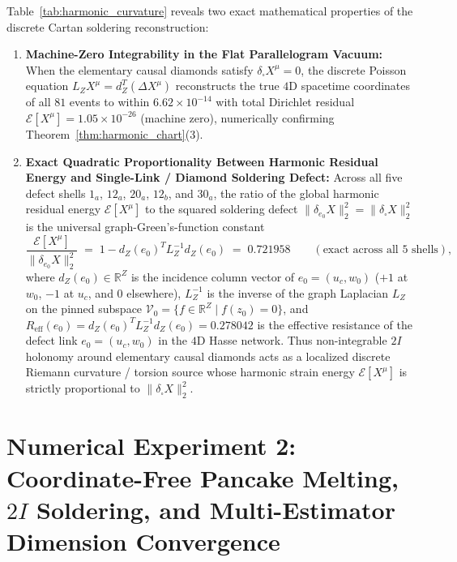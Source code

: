 \documentclass[11pt,a4paper]{article}
\theoremstyle{definition}
\theoremstyle{remark}
\newcommand{\R}{\mathbb{R}}
\begin{document}
Table~\ref{tab:harmonic_curvature} reveals two exact mathematical properties of the discrete Cartan soldering reconstruction:
\begin{enumerate}
    \item \textbf{Machine-Zero Integrability in the Flat Parallelogram Vacuum:} When the elementary causal diamonds satisfy $\delta_\square X^\mu = 0$, the discrete Poisson equation $L_Z X^\mu = d_Z^T(\Delta X^\mu)$ reconstructs the true $4\text{D}$ spacetime coordinates of all $81$ events to within $6.62 \times 10^{-14}$ with total Dirichlet residual $\mathcal{E}[X^\mu] = 1.05 \times 10^{-26}$ (machine zero), numerically confirming Theorem~\ref{thm:harmonic_chart}(3).
    \item \textbf{Exact Quadratic Proportionality Between Harmonic Residual Energy and Single-Link / Diamond Soldering Defect:} Across all five defect shells $1_a$, $12_a$, $20_a$, $12_b$, and $30_a$, the ratio of the global harmonic residual energy $\mathcal{E}[X^\mu]$ to the squared soldering defect $\|\delta_{e_0} X\|_2^2 = \|\delta_\square X\|_2^2$ is the universal graph-Green's-function constant
    \begin{equation}
    \label{eq:greens_ratio}
    \frac{\mathcal{E}[X^\mu]}{\|\delta_{e_0} X\|_2^2} \;=\; 1 - d_Z(e_0)^T L_Z^{-1} d_Z(e_0) \;=\; 0.721958 \qquad (\text{exact across all } 5 \text{ shells}),
    \end{equation}
    where $d_Z(e_0) \in \R^Z$ is the incidence column vector of $e_0 = (u_c, w_0)$ ($+1$ at $w_0$, $-1$ at $u_c$, and $0$ elsewhere), $L_Z^{-1}$ is the inverse of the graph Laplacian $L_Z$ on the pinned subspace $\mathcal{V}_0 = \{f \in \R^Z \mid f(z_0) = 0\}$, and $R_{\mathrm{eff}}(e_0) = d_Z(e_0)^T L_Z^{-1} d_Z(e_0) = 0.278042$ is the effective resistance of the defect link $e_0 = (u_c, w_0)$ in the $4\text{D}$ Hasse network. Thus non-integrable $2I$ holonomy around elementary causal diamonds acts as a localized discrete Riemann curvature / torsion source whose harmonic strain energy $\mathcal{E}[X^\mu]$ is strictly proportional to $\|\delta_\square X\|_2^2$.
\end{enumerate}

\section{Numerical Experiment 2: Coordinate-Free Pancake Melting, \texorpdfstring{$2I$}{2I} Soldering, and Multi-Estimator Dimension Convergence}
\label{sec:exp_melting}
\end{document}
